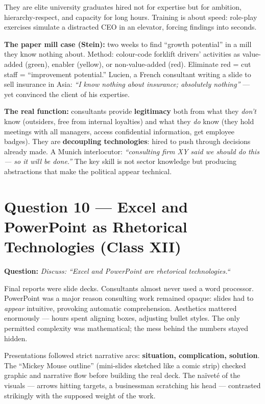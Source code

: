 \documentclass[a4paper,12pt]{article}
\begin{document}
They are elite university graduates hired not for expertise but for ambition, hierarchy-respect, and capacity for long hours. Training is about speed: role-play exercises simulate a distracted CEO in an elevator, forcing findings into seconds.

\textbf{The paper mill case (Stein):} two weeks to find ``growth potential'' in a mill they know nothing about. Method: colour-code forklift drivers' activities as value-added (green), enabler (yellow), or non-value-added (red). Eliminate red = cut staff = ``improvement potential.'' Lucien, a French consultant writing a slide to sell insurance in Asia: \textit{``I know nothing about insurance; absolutely nothing''} --- yet convinced the client of his expertise.

\textbf{The real function:} consultants provide \textbf{legitimacy} both from what they \textit{don't} know (outsiders, free from internal loyalties) and what they \textit{do} know (they hold meetings with all managers, access confidential information, get employee badges). They are \textbf{decoupling technologies}: hired to push through decisions already made. A Munich interlocutor: \textit{``consulting firm XY said we should do this --- so it will be done.''} The key skill is not sector knowledge but producing abstractions that make the political appear technical.

\vspace{1.5em}

\section{Question 10 — Excel and PowerPoint as Rhetorical Technologies (Class XII)}

\textbf{Question:} \textit{Discuss: ``Excel and PowerPoint are rhetorical technologies.``}

Final reports were slide decks. Consultants almost never used a word processor. PowerPoint was a major reason consulting work remained opaque: slides had to \textit{appear} intuitive, provoking automatic comprehension. Aesthetics mattered enormously --- hours spent aligning boxes, adjusting bullet styles. The only permitted complexity was mathematical; the mess behind the numbers stayed hidden.

Presentations followed strict narrative arcs: \textbf{situation, complication, solution}. The ``Mickey Mouse outline'' (mini-slides sketched like a comic strip) checked graphic and narrative flow before building the real deck. The naïveté of the visuals --- arrows hitting targets, a businessman scratching his head --- contrasted strikingly with the supposed weight of the work.
\end{document}
